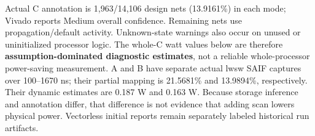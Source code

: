 \documentclass[11pt,a4paper]{article}
\begin{document}
Actual C annotation is 1,963/14,106 design nets (13.9161\%) in each mode; Vivado reports Medium overall confidence. Remaining nets use propagation/default activity. Unknown-state warnings also occur on unused or uninitialized processor logic. The whole-C watt values below are therefore \textbf{assumption-dominated diagnostic estimates}, not a reliable whole-processor power-saving measurement. A and B have separate actual lwsw SAIF captures over 100--1670 ns; their partial mapping is 21.5681\% and 13.9894\%, respectively. Their dynamic estimates are 0.187 W and 0.163 W. Because storage inference and annotation differ, that difference is not evidence that adding scan lowers physical power. Vectorless initial reports remain separately labeled historical run artifacts.



\begin{center}\end{center}


\begin{center}\end{center}
\end{document}
